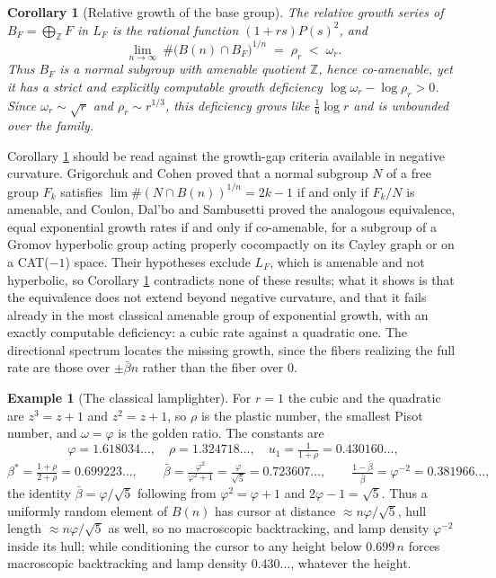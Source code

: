 \documentclass[11pt]{amsart}
\newtheorem{corollary}[theorem]{Corollary}
\theoremstyle{definition}
\newtheorem{example}[theorem]{Example}
\theoremstyle{remark}
\newcommand{\Z}{\mathbb{Z}}
\begin{document}
\begin{corollary}[Relative growth of the base group]\label{cor:gap}
The relative growth series of $B_F=\bigoplus_\Z F$ in $L_F$ is the rational function $(1+rs)P(s)^{2}$, and
\[
\lim_{n\to\infty}\ \#\big(B(n)\cap B_F\big)^{1/n}\;=\;\rho_r\;<\;\omega_r .
\]
Thus $B_F$ is a normal subgroup with amenable quotient $\Z$, hence co-amenable, yet it has a strict and explicitly computable growth deficiency $\log\omega_r-\log\rho_r>0$. Since $\omega_r\sim\sqrt r$ and $\rho_r\sim r^{1/3}$, this deficiency grows like $\tfrac16\log r$ and is unbounded over the family.
\end{corollary}

Corollary \ref{cor:gap} should be read against the growth-gap criteria available in negative curvature. Grigorchuk \cite{Grigorchuk80} and Cohen \cite{Cohen82} proved that a normal subgroup $N$ of a free group $F_k$ satisfies $\lim\#(N\cap B(n))^{1/n}=2k-1$ if and only if $F_k/N$ is amenable, and Coulon, Dal'bo and Sambusetti \cite{CDS18} proved the analogous equivalence, equal exponential growth rates if and only if co-amenable, for a subgroup of a Gromov hyperbolic group acting properly cocompactly on its Cayley graph or on a CAT($-1$) space. Their hypotheses exclude $L_F$, which is amenable and not hyperbolic, so Corollary \ref{cor:gap} contradicts none of these results; what it shows is that the equivalence does not extend beyond negative curvature, and that it fails already in the most classical amenable group of exponential growth, with an exactly computable deficiency: a cubic rate against a quadratic one. The directional spectrum locates the missing growth, since the fibers realizing the full rate are those over $\pm\bar\beta n$ rather than the fiber over $0$.

\begin{example}[The classical lamplighter]\label{ex:classical}
For $r=1$ the cubic and the quadratic are $z^{3}=z+1$ and $z^{2}=z+1$, so $\rho$ is the plastic number, the smallest Pisot number, and $\omega=\varphi$ is the golden ratio. The constants are
\[
\varphi=1.618034\ldots,\quad
\rho=1.324718\ldots,\quad
u_1=\tfrac1{1+\rho}=0.430160\ldots,
\]
\[
\beta^{*}=\tfrac{1+\rho}{2+\rho}=0.699223\ldots,
\qquad
\bar\beta=\tfrac{\varphi^{2}}{\varphi^{2}+1}=\tfrac{\varphi}{\sqrt5}=0.723607\ldots,
\qquad
\tfrac{1-\bar\beta}{\bar\beta}=\varphi^{-2}=0.381966\ldots,
\]
the identity $\bar\beta=\varphi/\sqrt5$ following from $\varphi^{2}=\varphi+1$ and $2\varphi-1=\sqrt5$. Thus a uniformly random element of $B(n)$ has cursor at distance $\approx n\varphi/\sqrt5$, hull length $\approx n\varphi/\sqrt5$ as well, so no macroscopic backtracking, and lamp density $\varphi^{-2}$ inside its hull; while conditioning the cursor to any height below $0.699\,n$ forces macroscopic backtracking and lamp density $0.430\ldots$, whatever the height.
\end{example}
\end{document}
